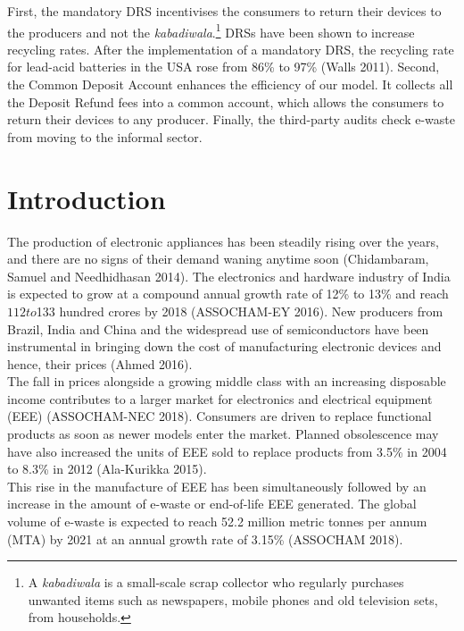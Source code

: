 \documentclass[a4paper, 12pt]{article}
\begin{document}
                     First, the mandatory DRS incentivises the consumers to return their devices to the producers and not the \textit{kabadiwala}.\footnote{A \textit{kabadiwala} is a small-scale scrap collector who regularly purchases unwanted items such as newspapers, mobile phones and old television sets, from households.} DRSs have been shown to increase recycling rates. After the implementation of a mandatory DRS, the recycling rate for lead-acid batteries in the USA rose from 86\% to 97\% (Walls 2011). Second, the Common Deposit Account enhances the efficiency of our model. It collects all the Deposit Refund fees into a common account, which allows the consumers to return their devices to any producer. Finally, the third-party audits check e-waste from moving to the informal sector.\\
                    
                    \newpage
                    \section{Introduction}
                    The production of electronic appliances has been steadily rising over the years, and there are no signs of their demand waning anytime soon (Chidambaram, Samuel and Needhidhasan 2014). The electronics and hardware industry of India is expected to grow at a compound annual growth rate of 12\% to 13\% and reach $112 to $133 hundred crores by 2018 (ASSOCHAM-EY 2016). New producers from Brazil, India and China and the widespread use of semiconductors have been instrumental in bringing down the cost of manufacturing electronic devices and hence, their prices (Ahmed 2016). \\
                    
                    The fall in prices alongside a growing middle class with an increasing disposable income contributes to a larger market for electronics and electrical equipment (EEE) (ASSOCHAM-NEC 2018). Consumers are driven to replace functional products as soon as newer models enter the market. Planned obsolescence may have also increased the units of EEE sold to replace products from 3.5\% in 2004 to 8.3\% in 2012 (Ala-Kurikka 2015). \\
                   
                   This rise in the manufacture of EEE has been simultaneously followed by an increase in the amount of e-waste or end-of-life EEE generated. The global volume of e-waste is expected to reach 52.2 million metric tonnes per annum (MTA) by 2021 at an annual growth rate of 3.15\% (ASSOCHAM 2018). \\ 
                    
\end{document}
